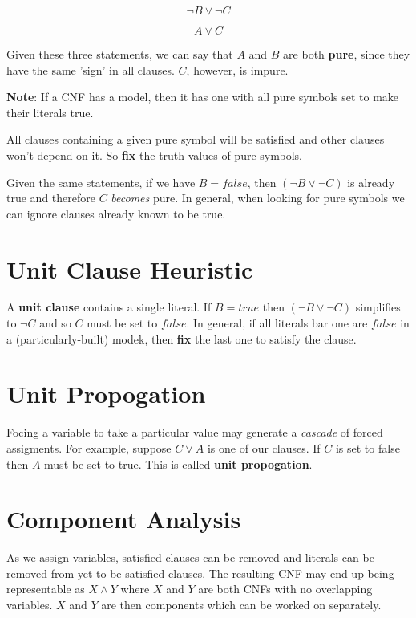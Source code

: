 \documentclass[11pt]{article}
\begin{document}
\begin{equation}
\neg B \lor \neg C
\end{equation}

\begin{equation}
A \lor C
\end{equation}

Given these three statements, we can say that \(A\) and \(B\) are both \textbf{pure}, since they have the same 'sign' in all clauses.
\(C\), however, is impure.

\textbf{Note}: If a CNF has a model, then it has one with all pure symbols set to make their literals true.

All clauses containing a given pure symbol will be satisfied and other clauses won't depend on it.
So \textbf{fix} the truth-values of pure symbols.

Given the same statements, if we have \(B = false\), then \((\neg B \lor \neg C)\) is already true and therefore \(C\) \emph{becomes} pure.
In general, when looking for pure symbols we can ignore clauses already known to be true.

\section{Unit Clause Heuristic}
\label{sec:org431c5ce}
A \textbf{unit clause} contains a single literal.
If \(B = true\) then \((\neg B \lor \neg C)\) simplifies to \(\neg C\) and so \(C\) must be set to \(false\).
In general, if all literals bar one are \(false\) in a (particularly-built) modek, then \textbf{fix} the last one to satisfy the clause.

\section{Unit Propogation}
\label{sec:org17e6f87}
Focing a variable to take a particular value may generate a \emph{cascade} of forced assigments.
For example, suppose \(C \lor A\) is one of our clauses.
If \(C\) is set to false then \(A\) must be set to true.
This is called \textbf{unit propogation}.

\section{Component Analysis}
\label{sec:org55b2faa}
As we assign variables, satisfied clauses can be removed and literals can be removed from yet-to-be-satisfied clauses.
The resulting CNF may end up being representable as \(X \land Y\) where \(X\) and \(Y\) are both CNFs with no overlapping variables.
\(X\) and \(Y\) are then components which can be worked on separately.
\end{document}
